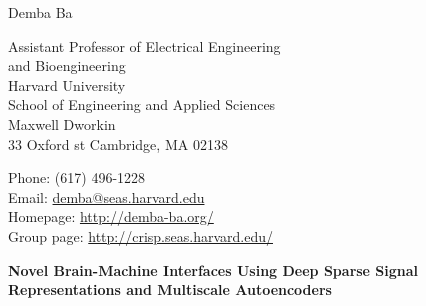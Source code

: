 \documentclass[12pt]{article}
\makeatletter
\let\saved@bibitem\@bibitem %
\def\HCode#1{}
\def\name{Demba Ba}
\makeatother
\begin{document}
\sloppy

\begingroup
\makeatletter
\let\@bibitem\saved@bibitem %
\endgroup

\HCode{<div class="fluid-container"}

\HCode{<div class="row">}
\HCode{<div class="col-md-12">}
\HCode{<h1>}
{\huge \name}
\HCode{</h1>}
\HCode{</div>} %
\HCode{</div>} %

\bigskip

\HCode{<div class="row">}
\HCode{<div class="col-md-4">}
\begin{minipage}[t]{0.5\textwidth}
  Assistant Professor of Electrical Engineering \\
  and Bioengineering \\
  Harvard University \\
  School of Engineering and Applied Sciences \\
  Maxwell Dworkin \\
  33 Oxford st
  Cambridge, MA 02138 \\
\end{minipage}
\HCode{</div>} %
\HCode{<div class="col-md-8">}
\begin{minipage}[t]{0.5\textwidth}
  Phone: (617) 496-1228 \\
  Email: \href{mailto:demba@seas.harvard.edu}{demba@seas.harvard.edu} \\
  Homepage: \href{http://demba-ba.org/}{http://demba-ba.org/} \\
  Group page: \href{http://crisp.seas.harvard.edu}{http://crisp.seas.harvard.edu/}
\end{minipage}
\HCode{</div>} %
\HCode{</div>} %

\begin{center} {\large \textbf{Novel Brain-Machine Interfaces Using Deep Sparse Signal Representations and Multiscale Autoencoders}}%
\end{center}
\end{document}

